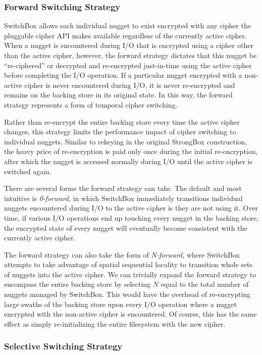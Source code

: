 \subsubsection{Forward Switching Strategy}

SwitchBox allows each individual nugget to exist encrypted with any cipher the
pluggable cipher API makes available regardless of the currently active cipher.
When a nugget is encountered during I/O that is encrypted using a cipher other
than the active cipher, however, the forward strategy dictates that this nugget
be ``re-ciphered'' or decrypted and re-encrypted just-in-time using the active
cipher before completing the I/O operation. If a particular nugget encrypted
with a non-active cipher is never encountered during I/O, it is never
re-encrypted and remains on the backing store in its original state. In this
way, the forward strategy represents a form of temporal cipher switching.

Rather than re-encrypt the entire backing store every time the active cipher
changes, this strategy limits the performance impact of cipher switching to
individual nuggets. Similar to rekeying in the original StrongBox construction,
the heavy price of re-encryption is paid only once during the initial
re-encryption, after which the nugget is accessed normally during I/O until the
active cipher is switched again.

There are several forms the forward strategy can take. The default and most
intuitive is \emph{0-forward}, in which SwitchBox immediately transitions
individual nuggets encountered during I/O to the active cipher is they are not
using it. Over time, if various I/O operations end up touching every nugget in
the backing store, the encrypted state of every nugget will eventually become
consistent with the currently active cipher.

The forward strategy can also take the form of \emph{N-forward}, where SwitchBox
attempts to take advantage of spatial sequential locality to transition whole
sets of nuggets into the active cipher. We can trivially expand the forward
strategy to encompass the entire backing store by selecting $N$ equal to the
total number of nuggets managed by SwitchBox. This would have the overhead of
re-encrypting large swaths of the backing store upon every I/O operation where a
nugget encrypted with the non-active cipher is encountered. Of course, this has
the same effect as simply re-initializing the entire filesystem with the new
cipher.

\subsubsection{Selective Switching Strategy}

